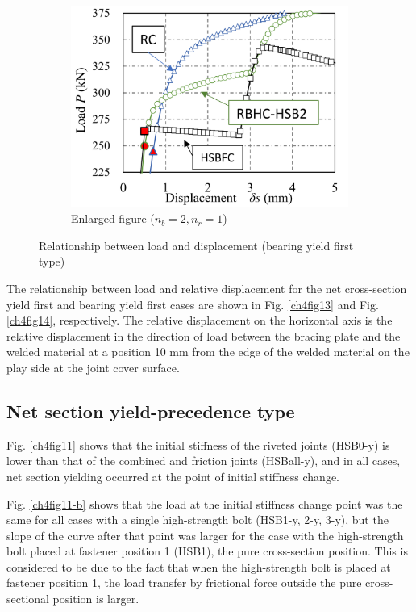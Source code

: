 \begin{figure}[htbp]
\begin{subfigure}[t]{0.48\textwidth}
    \label{ch4fig12-b}
    \end{subfigure}
    \hfill
    \begin{subfigure}[t]{0.48\textwidth}
    \includegraphics[width=\linewidth]{imgs/ch4/fig12-c.pdf}
    \caption{Enlarged figure ($n_b=2, n_r=1$)}
    \label{ch4fig12-c}
    \end{subfigure}
    \caption{Relationship between load and displacement (bearing yield first type)}
    \label{ch4fig12}
\end{figure}

The relationship between load and relative displacement for the net cross-section yield first and bearing yield first cases are shown in Fig. \ref{ch4fig13} and Fig. \ref{ch4fig14}, respectively. The relative displacement on the horizontal axis is the relative displacement in the direction of load between the bracing plate and the welded material at a position 10 mm from the edge of the welded material on the play side at the joint cover surface.

\subsection{Net section yield-precedence type}

Fig. \ref{ch4fig11} shows that the initial stiffness of the riveted joints (HSB0-y) is lower than that of the combined and friction joints (HSBall-y), and in all cases, net section yielding occurred at the point of initial stiffness change.

Fig. \ref{ch4fig11-b} shows that the load at the initial stiffness change point was the same for all cases with a single high-strength bolt (HSB1-y, 2-y, 3-y), but the slope of the curve after that point was larger for the case with the high-strength bolt placed at fastener position 1 (HSB1), the pure cross-section position. This is considered to be due to the fact that when the high-strength bolt is placed at fastener position 1, the load transfer by frictional force outside the pure cross-sectional position is larger.

